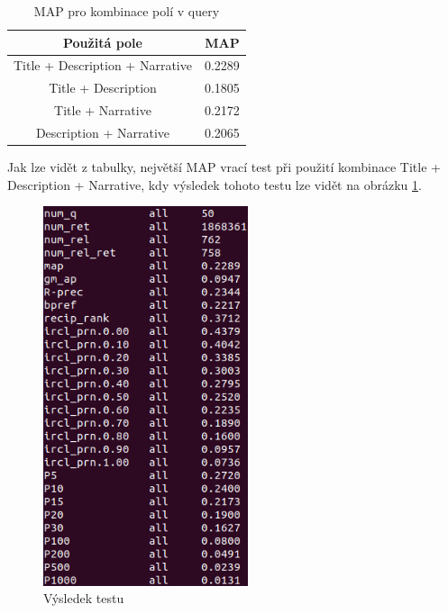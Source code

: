 \documentclass[12pt, a4paper]{article}
\begin{document}
\begin{table}[h!]
  \begin{center}

\begin{tabular}{| c |c |}
\hline
  \textbf{Použitá pole} & \textbf{MAP}\\
\hline
Title + Description + Narrative & 0.2289\\
\hline
Title + Description & 0.1805\\
\hline
Title + Narrative & 0.2172\\
\hline
Description + Narrative & 0.2065\\
\hline
\end{tabular}
\end{center}
	\caption{MAP pro kombinace polí v query}
	\label{fig:map_combination}
\end{table}

Jak lze vidět z tabulky, největší MAP vrací test při použití kombinace Title + Description + Narrative, kdy výsledek tohoto testu lze vidět na obrázku \ref{fig:evaluation}.

\begin{figure}[h]
	\centering
	\includegraphics[width=6cm]{img/evaluation.png}
	\caption{Výsledek testu}
	\label{fig:evaluation}
\end{figure}
\end{document}
